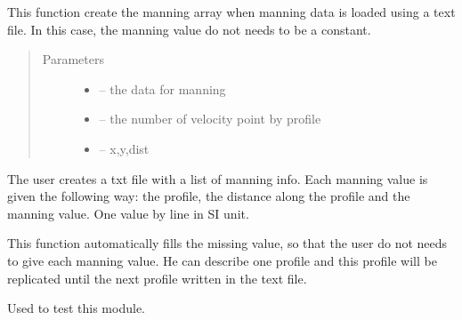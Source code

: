 \documentclass[letterpaper,10pt,english]{sphinxmanual}
\begin{document}
\begin{fulllineitems}
\label{\detokenize{index:src.dist_vistess2.get_manning_arr}}
This function create the manning array when manning data is loaded using a text file. In this case, the manning
value do not needs to be a constant.
\begin{quote}\begin{description}
\item[{Parameters}] \leavevmode\begin{itemize}
\item {} 
 -- the data for manning

\item {} 
 -- the number of velocity point by profile

\item {} 
 -- x,y,dist

\end{itemize}

\end{description}\end{quote}


The user creates a txt file with a list of manning info. Each manning value is given the following way:
the profile, the distance along the profile and the manning value. One value by line in SI unit.

This function automatically fills the missing value, so that the user do not needs to give each manning value.
He can describe one profile and this profile will be replicated until the next profile written in the text file.

\end{fulllineitems}


\begin{fulllineitems}
\label{\detokenize{index:src.dist_vistess2.main}}
Used to test this module.

\end{fulllineitems}

\end{document}
